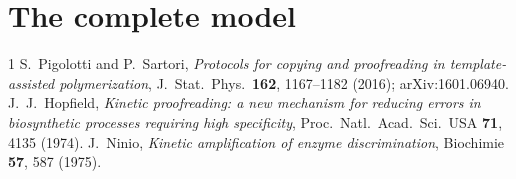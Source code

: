 \appendix
\section{The complete model}


\begin{thebibliography}{1}
 S.~Pigolotti and P.~Sartori, \emph{Protocols for copying and
proofreading in template-assisted polymerization}, J.~Stat.~Phys.~\textbf{162},
1167--1182 (2016); arXiv:1601.06940.
 J.~J.~Hopfield, \emph{Kinetic proofreading: a new mechanism for
reducing errors in biosynthetic processes requiring high specificity},
Proc.~Natl.~Acad.~Sci.~USA \textbf{71}, 4135 (1974).
 J.~Ninio, \emph{Kinetic amplification of enzyme discrimination},
Biochimie \textbf{57}, 587 (1975).
\end{thebibliography}
